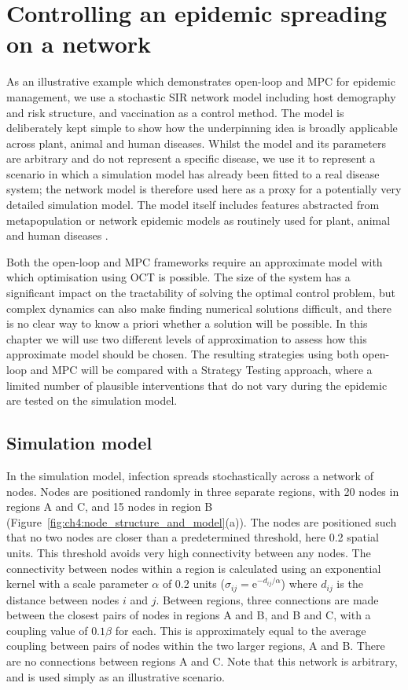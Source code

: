 \section{Controlling an epidemic spreading on a network\label{sec:ch4:Controlling}}

As an illustrative example which demonstrates open-loop and MPC for epidemic management, we use a stochastic SIR network model including host demography and risk structure, and vaccination as a control method. The model is deliberately kept simple to show how the underpinning idea is broadly applicable across plant, animal and human diseases. Whilst the model and its parameters are arbitrary and do not represent a specific disease, we use it to represent a scenario in which a simulation model has already been fitted to a real disease system; the network model is therefore used here as a proxy for a potentially very detailed simulation model. The model itself includes features abstracted from metapopulation or network epidemic models as routinely used for plant, animal and human diseases \citep{rowthorn_optimal_2009, keeling_dynamics_2001, keeling_metapopulation_2000, margosian_connectivity_2009, bansal_individual_2007}.

Both the open-loop and MPC frameworks require an approximate model with which optimisation using OCT is possible. The size of the system has a significant impact on the tractability of solving the optimal control problem, but complex dynamics can also make finding numerical solutions difficult, and there is no clear way to know a priori whether a solution will be possible. In this chapter we will use two different levels of approximation to assess how this approximate model should be chosen. The resulting strategies using both open-loop and MPC will be compared with a Strategy Testing approach, where a limited number of plausible interventions that do not vary during the epidemic are tested on the simulation model. 

\subsection{Simulation model}

In the simulation model, infection spreads stochastically across a network of nodes. Nodes are positioned randomly in three separate regions, with 20 nodes in regions A and C, and 15 nodes in region B (Figure~\ref{fig:ch4:node_structure_and_model}(a)). The nodes are positioned such that no two nodes are closer than a predetermined threshold, here 0.2 spatial units. This threshold avoids very high connectivity between any nodes. The connectivity between nodes within a region is calculated using an exponential kernel with a scale parameter $\alpha$ of 0.2 units ($\sigma_{ij} = \mathrm{e}^{-d_{ij}/\alpha}$) where $d_{ij}$ is the distance between nodes $i$ and $j$. Between regions, three connections are made between the closest pairs of nodes in regions A and B, and B and C, with a coupling value of $0.1\beta$ for each. This is approximately equal to the average coupling between pairs of nodes within the two larger regions, A and B. There are no connections between regions A and C. Note that this network is arbitrary, and is used simply as an illustrative scenario.

